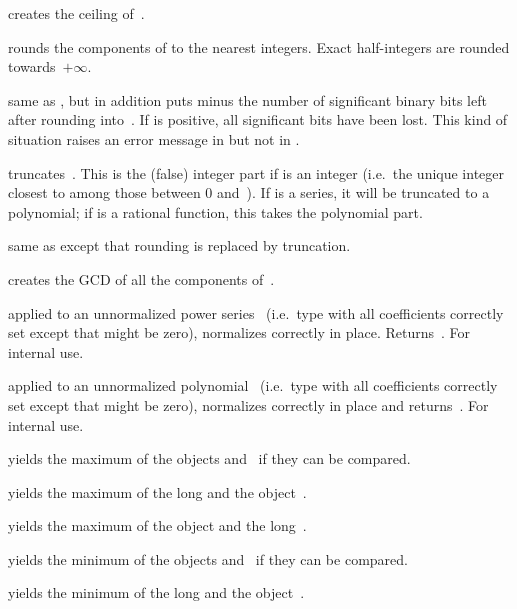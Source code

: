  creates the ceiling of~.

 rounds the components of  to the nearest
integers. Exact half-integers are rounded towards~$+\infty$.

 same as , but in addition puts
minus the number of significant binary bits left after rounding into~.
If  is positive, all significant bits have been lost. This kind of
situation raises an error message in  but not in .

 truncates~. This is the (false) integer part
if  is an integer (i.e.~the unique integer closest to  among
those between 0 and~). If  is a series, it will be truncated
to a polynomial; if  is a rational function, this takes the
polynomial part.

 same as  except that
rounding is replaced by truncation.

 creates the GCD of all the components of~.

 applied to an unnormalized power series~
(i.e.~type  with all coefficients correctly set except that 
might be zero), normalizes  correctly in place. Returns~.
For internal use.

 applied to an unnormalized polynomial~
(i.e.~type  with all coefficients correctly set except that 
might be zero), normalizes  correctly in place and returns~.
For internal use.


 yields the maximum of the objects
 and~ if they can be compared.

 yields the maximum of the long
 and the object~.

 yields the maximum of the object
 and the long~.

 yields the minimum of the objects
 and~ if they can be compared.

 yields the minimum of the long
 and the object~.

